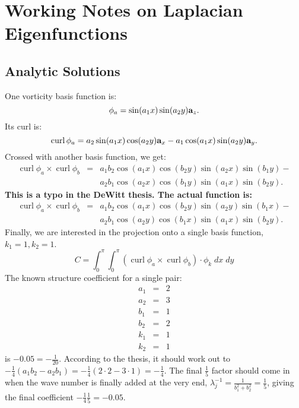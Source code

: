 \documentclass[12pt,onecolumn]{article}
\newcommand{\bolda}{{\bf a}}
\DeclareMathOperator{\curl}{curl}
\begin{document}
\vspace*{1em}
\section{Working Notes on Laplacian Eigenfunctions}
\subsection{Analytic Solutions}

One vorticity basis function is:
\begin{equation}
\phi_a = \sin(a_1x) \sin(a_2 y) \bolda_z.
\end{equation}
Its curl is:
\begin{equation}
\curl \phi_a = a_2 \sin(a_1x) \cos(a_2 y) \bolda_x - a_1 \cos(a_1 x) \sin(a_2 y) \bolda_y.
\end{equation}
Crossed with another basis function, we get:
\begin{eqnarray}
\curl \phi_a \times \curl \phi_b &=& a_1 b_2 \cos(a_1 x) \cos(b_2 y) \sin(a_2 x) \sin(b_1 y) - \\
&& a_2 b_1 \cos(a_2 x) \cos(b_1 y) \sin(a_1 x) \sin(b_2 y).
\end{eqnarray}
{\bf This is a typo in the DeWitt thesis. The actual function is:}
\begin{eqnarray}
\curl \phi_a \times \curl \phi_b &=& a_1 b_2 \cos(a_1 x) \cos(b_2 y) \sin(a_2 y) \sin(b_1 x) - \\
&& a_2 b_1 \cos(a_2 y) \cos(b_1 x) \sin(a_1 x) \sin(b_2 y).
\end{eqnarray}
Finally, we are interested in the projection onto a single basis function, $k_1 = 1, k_2 = 1$.
\begin{equation}
C = \int_0^\pi \int_0^\pi (\curl \phi_a \times \curl \phi_b) \cdot \phi_k \;dx\;dy
\end{equation}
The known structure coefficient for a single pair:
\begin{eqnarray}
a_1 &=& 2 \\
a_2 &=& 3 \\
b_1 &=& 1 \\
b_2 &=& 2 \\
k_1 &=& 1 \\
k_2 &=& 1
\end{eqnarray}
is $-0.05 = -\frac{1}{20}$. According to the thesis, it should work out to $-\frac{1}{4}(a_1 b_2 - a_2 b_1) = -\frac{1}{4}(2 \cdot 2 - 3 \cdot 1) = -\frac{1}{4}$. The final $\frac{1}{5}$ factor should come in when the wave number is finally added at the very end, $\lambda_j^{-1} = \frac{1}{b_1^2 + b_2^2} = \frac{1}{5}$, giving the final coefficient $-\frac{1}{4}\frac{1}{5} = -0.05$.
\end{document}
